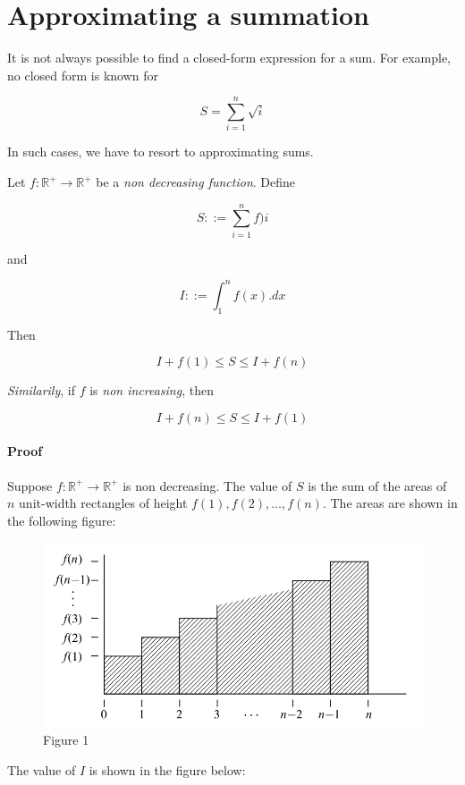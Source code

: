 \documentclass{article}
\newcommand{\R}{\ensuremath{\mathbb{R}}}
\begin{document}
\section{Approximating a summation}
It is not always possible to find a closed-form expression for a sum. For example, no closed form is known for

$$
S = \sum_{i = 1}^{n} \sqrt{i}
$$

In such cases, we have to resort to approximating sums.

Let $f : \R^{+} \rightarrow \R^{+}$ be a \textit{non decreasing function}. Define

$$
S ::= \sum_{i = 1}^{n}f)i
$$

and

$$
I ::= \int_{1}^{n} f(x).dx
$$

Then

$$
I + f(1) \le S \le I + f(n)
$$

\textit{Similarily}, if $f$ is \textit{non increasing}, then

$$
I + f(n) \le S \le I + f(1)
$$

\paragraph{Proof}
Suppose $f : \R^{+} \rightarrow \R^{+}$ is non decreasing. The value of $S$ is the sum of the areas of $n$ unit-width rectangles of height $f(1), f(2), \dots, f(n)$. The areas are shown in the following figure:

\begin{figure}[h!]
    \includegraphics[width=\linewidth]{resources/13_1.png}
    \caption{Figure 1}
    \label{fig:p1}
\end{figure}

The value of $I$ is shown in the figure below:
\end{document}
